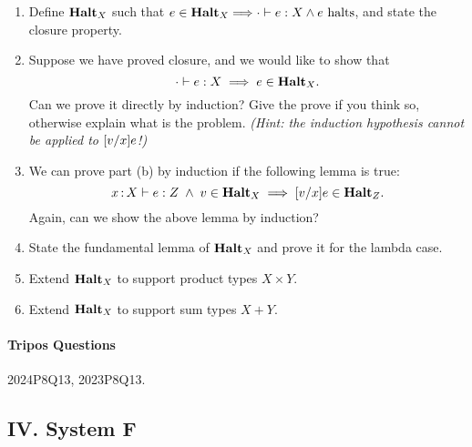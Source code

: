 \documentclass[11pt,a4paper,twoside]{article}
\begin{document}
\begin{enumerate}[label=(\alph*)]
  \item Define $\textbf{Halt}_X$ such that 
    $e \in \textbf{Halt}_X \Longrightarrow \cdot \vdash e : X \wedge e\text{ halts}$,  
  and state the closure property.

  \item Suppose we have proved closure, and we would like to show that
    \[ \cdot \vdash e : X \;\Longrightarrow\; e \in \textbf{Halt}_X. \]
  Can we prove it directly by induction? 
  Give the prove if you think so, otherwise explain what is the problem.
  \emph{(Hint: the induction hypothesis cannot be applied to $[v / x] e$!)}

  \item We can prove part (b) by induction if the following lemma is true:
    \[ 
      x \,{:}\, X \vdash e : Z \;\wedge\; 
      v \in \textbf{Halt}_X \;\Longrightarrow\; 
      [v / x] e \in \textbf{Halt}_Z. 
    \]
  Again, can we show the above lemma by induction?

  \item State the fundamental lemma of $\textbf{Halt}_X$ and prove it for the lambda case.

  \item Extend $\textbf{Halt}_X$ to support product types $X \times Y$.
  
  \item Extend $\textbf{Halt}_X$ to support sum types $X + Y$.
\end{enumerate}

\paragraph{Tripos Questions} 2024P8Q13, 2023P8Q13.

\subsection*{IV. System F}

\end{document}
